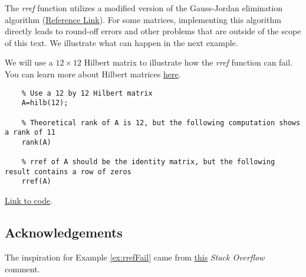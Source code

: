 \documentclass{ximera}
\begin{document}
\begin{warning}
    The \emph{rref} function utilizes a modified version of the Gauss-Jordan elimination algorithm (\href{https://www.mathworks.com/help/matlab/ref/rref.html}{Reference Link}).  For some matrices, implementing this algorithm directly leads to round-off errors and other problems that are outside of the scope of this text.  %
    We illustrate what can happen in the next example.   
\end{warning}

\begin{example}\label{ex:rrefFail}
    We will use a $12\times 12$ Hilbert matrix to illustrate how the \emph{rref} function can fail.  You can learn more about Hilbert matrices \href{https://en.wikipedia.org/wiki/Hilbert_matrix}{here}.

    \begin{verbatim}
    % Use a 12 by 12 Hilbert matrix
    A=hilb(12);

    % Theoretical rank of A is 12, but the following computation shows a rank of 11
    rank(A)

    % rref of A should be the identity matrix, but the following result contains a row of zeros
    rref(A)
    \end{verbatim}

    \href{https://sagecell.sagemath.org/?z=eJxtjjEOwjAMRfdKuYOXSkViSVfE0I0DwAGS1iUWaYwSR6WcnrSFjcWyrP_fcw23hGBAt2CXdV7IW4wCk5FIL1V1Z1cujW4PJ1WpqoarQ44o1BsP0YQH8AgdUCrlI9gsIA5hZO95pnCHnqdnFiPEAZLjORXZr6a1qta96Q47O0Ycd16JZj-AxQ1HAwYhWb5f_fNETNlL0QUxFDYLzyvrjZFT8RR08XwAMi9N1g==&lang=octave&interacts=eJyLjgUAARUAuQ==}{Link to code}.

\end{example}

\subsection*{Acknowledgements}

The inspiration for Example \ref{ex:rrefFail} came from \href{https://stackoverflow.com/questions/42893111/matlab-rref-function-precision-error-after-12th-column-of-hilbert-matrices}{this} \emph{Stack Overflow} comment.
\end{document}
